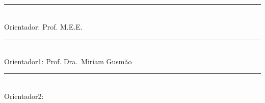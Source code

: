 \documentclass[12pt,a4paper,oneside,brazil]{abntex2}
\newcommand{\grauOrientador}{Prof. M.E.E.}
\newcommand{\grauBancaUm}{Prof. Dra.}
\newcommand{\bancaUm}{Miriam Gusmão}
\newcommand{\grauBancaDois}{}
\newcommand{\bancaDois}{}
\begin{document}
    \centering

    \vspace*{3cm}

    \begin{flushright}
    \rule{10cm}{0.4pt}\\
    \textnormal{Orientador: \grauOrientador \imprimirorientador}

    \vspace*{10mm}

    \rule{10cm}{0.4pt}\\
    \textnormal{Orientador1: \grauBancaUm \, \bancaUm}

    \vspace*{10mm}

    \rule{10cm}{0.4pt}\\
    \textnormal{Orientador2: \grauBancaDois \, \bancaDois}
    \end{flushright}

    \vspace*{6cm}

    \bfseries{\imprimirlocal}

    \bfseries{\imprimirdata}
\clearpage %
\end{document}
